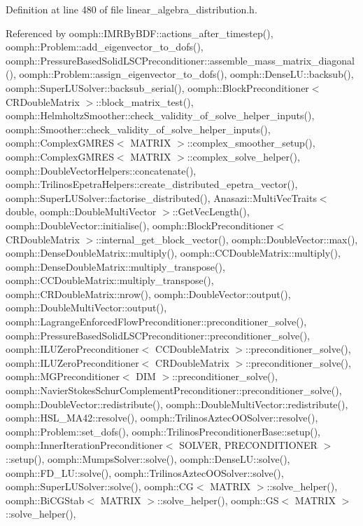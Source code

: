 Definition at line 480 of file linear\+\_\+algebra\+\_\+distribution.\+h.



Referenced by oomph\+::\+I\+M\+R\+By\+B\+D\+F\+::actions\+\_\+after\+\_\+timestep(), oomph\+::\+Problem\+::add\+\_\+eigenvector\+\_\+to\+\_\+dofs(), oomph\+::\+Pressure\+Based\+Solid\+L\+S\+C\+Preconditioner\+::assemble\+\_\+mass\+\_\+matrix\+\_\+diagonal(), oomph\+::\+Problem\+::assign\+\_\+eigenvector\+\_\+to\+\_\+dofs(), oomph\+::\+Dense\+L\+U\+::backsub(), oomph\+::\+Super\+L\+U\+Solver\+::backsub\+\_\+serial(), oomph\+::\+Block\+Preconditioner$<$ C\+R\+Double\+Matrix $>$\+::block\+\_\+matrix\+\_\+test(), oomph\+::\+Helmholtz\+Smoother\+::check\+\_\+validity\+\_\+of\+\_\+solve\+\_\+helper\+\_\+inputs(), oomph\+::\+Smoother\+::check\+\_\+validity\+\_\+of\+\_\+solve\+\_\+helper\+\_\+inputs(), oomph\+::\+Complex\+G\+M\+R\+E\+S$<$ M\+A\+T\+R\+I\+X $>$\+::complex\+\_\+smoother\+\_\+setup(), oomph\+::\+Complex\+G\+M\+R\+E\+S$<$ M\+A\+T\+R\+I\+X $>$\+::complex\+\_\+solve\+\_\+helper(), oomph\+::\+Double\+Vector\+Helpers\+::concatenate(), oomph\+::\+Trilinos\+Epetra\+Helpers\+::create\+\_\+distributed\+\_\+epetra\+\_\+vector(), oomph\+::\+Super\+L\+U\+Solver\+::factorise\+\_\+distributed(), Anasazi\+::\+Multi\+Vec\+Traits$<$ double, oomph\+::\+Double\+Multi\+Vector $>$\+::\+Get\+Vec\+Length(), oomph\+::\+Double\+Vector\+::initialise(), oomph\+::\+Block\+Preconditioner$<$ C\+R\+Double\+Matrix $>$\+::internal\+\_\+get\+\_\+block\+\_\+vector(), oomph\+::\+Double\+Vector\+::max(), oomph\+::\+Dense\+Double\+Matrix\+::multiply(), oomph\+::\+C\+C\+Double\+Matrix\+::multiply(), oomph\+::\+Dense\+Double\+Matrix\+::multiply\+\_\+transpose(), oomph\+::\+C\+C\+Double\+Matrix\+::multiply\+\_\+transpose(), oomph\+::\+C\+R\+Double\+Matrix\+::nrow(), oomph\+::\+Double\+Vector\+::output(), oomph\+::\+Double\+Multi\+Vector\+::output(), oomph\+::\+Lagrange\+Enforced\+Flow\+Preconditioner\+::preconditioner\+\_\+solve(), oomph\+::\+Pressure\+Based\+Solid\+L\+S\+C\+Preconditioner\+::preconditioner\+\_\+solve(), oomph\+::\+I\+L\+U\+Zero\+Preconditioner$<$ C\+C\+Double\+Matrix $>$\+::preconditioner\+\_\+solve(), oomph\+::\+I\+L\+U\+Zero\+Preconditioner$<$ C\+R\+Double\+Matrix $>$\+::preconditioner\+\_\+solve(), oomph\+::\+M\+G\+Preconditioner$<$ D\+I\+M $>$\+::preconditioner\+\_\+solve(), oomph\+::\+Navier\+Stokes\+Schur\+Complement\+Preconditioner\+::preconditioner\+\_\+solve(), oomph\+::\+Double\+Vector\+::redistribute(), oomph\+::\+Double\+Multi\+Vector\+::redistribute(), oomph\+::\+H\+S\+L\+\_\+\+M\+A42\+::resolve(), oomph\+::\+Trilinos\+Aztec\+O\+O\+Solver\+::resolve(), oomph\+::\+Problem\+::set\+\_\+dofs(), oomph\+::\+Trilinos\+Preconditioner\+Base\+::setup(), oomph\+::\+Inner\+Iteration\+Preconditioner$<$ S\+O\+L\+V\+E\+R, P\+R\+E\+C\+O\+N\+D\+I\+T\+I\+O\+N\+E\+R $>$\+::setup(), oomph\+::\+Mumps\+Solver\+::solve(), oomph\+::\+Dense\+L\+U\+::solve(), oomph\+::\+F\+D\+\_\+\+L\+U\+::solve(), oomph\+::\+Trilinos\+Aztec\+O\+O\+Solver\+::solve(), oomph\+::\+Super\+L\+U\+Solver\+::solve(), oomph\+::\+C\+G$<$ M\+A\+T\+R\+I\+X $>$\+::solve\+\_\+helper(), oomph\+::\+Bi\+C\+G\+Stab$<$ M\+A\+T\+R\+I\+X $>$\+::solve\+\_\+helper(), oomph\+::\+G\+S$<$ M\+A\+T\+R\+I\+X $>$\+::solve\+\_\+helper(), 